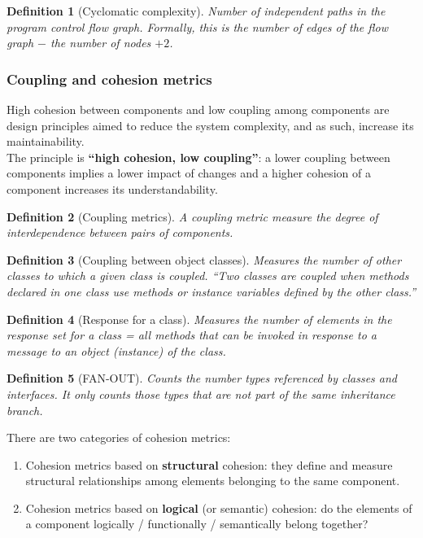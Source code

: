 \documentclass[a4paper,11pt]{report}
\newtheorem{definition}{Definition}
\begin{document}
\begin{definition}[Cyclomatic complexity]
Number of independent paths in the program control flow graph. Formally, this is
the number of edges of the flow graph $-$ the number of nodes $+2$.
\end{definition}

\subsubsection{Coupling and cohesion metrics}
High cohesion between components and low coupling among components are design
principles aimed to reduce the system complexity, and as such, increase its
maintainability.\\

The principle is \textbf{``high cohesion, low coupling''}: a lower coupling
between components implies a lower impact of changes and a higher cohesion of a
component increases its understandability.

\begin{definition}[Coupling metrics]
A coupling metric measure the degree of interdependence between pairs of
components.
\end{definition}

\begin{definition}[Coupling between object classes]
Measures the number of other classes to which a given class is coupled.
``Two classes are coupled when methods declared in one class use methods or
instance variables defined by the other class.''
\end{definition}

\begin{definition}[Response for a class]
Measures the number of elements in the response set for a class = all methods
that can be invoked in response to a message to an object (instance) of the
class.
\end{definition}

\begin{definition}[FAN-OUT]
Counts the number types referenced by classes and interfaces. It only counts
those types that are not part of the same inheritance branch.
\end{definition}

There are two categories of cohesion metrics:
\begin{enumerate}
\item Cohesion metrics based on \textbf{structural} cohesion: they define and
measure structural relationships among elements belonging to the same component.
\item Cohesion metrics based on \textbf{logical} (or semantic) cohesion: do the
elements of a component logically / functionally / semantically belong together?
\end{enumerate}
\end{document}
